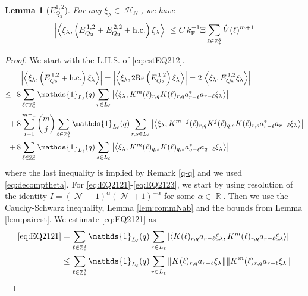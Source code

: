 \documentclass[12pt,a4paper]{article}
\numberwithin{equation}{section}
\newcommand{\1}{\mathbb{I}}
\newcommand{\F}{\mathrm{F}}
\DeclareMathOperator{\R}{\mathbb{R}}
\DeclareMathOperator{\Z}{\mathbb{Z}}
\DeclareMathOperator{\HH}{\mathcal{H}}
\DeclareMathOperator{\NN}{\mathcal{N}}
\newcommand{\eva}[1]{\left\langle #1 \right\rangle}
\theoremstyle{plain}
\newtheorem{lemma}[theorem]{Lemma}
\theoremstyle{definition}
\theoremstyle{remark}
\theoremstyle{plain}
\theoremstyle{definition}
\theoremstyle{remark}
\begin{document}
\begin{lemma}[$E_{Q_2}^{1,2}$]\label{lem:EQ212}
    For any $\xi_\lambda \in \HH_N$, we have
    \begin{alignat}{2}
    \abs{\eva{\xi_\lambda,\left(E^{\,1,2}_{Q_2}+E^{\,2,2}_{Q_2}+\mathrm{h.c.}\right) \xi_\lambda }}
   	\leq   C\, k_{\F}^{-1} \Xi \sum\limits_{\ell \in \Z^3_*} \hat{V}(\ell)^{m+1} \label{eq:estEQ212}
    \end{alignat}
\end{lemma}
\begin{proof}
     We start with the L.H.S. of \eqref{eq:estEQ212}.
    \begin{align}
    	&\abs{\eva{\xi_\lambda,\left(E^{\,1,2}_{Q_2}+\mathrm{h.c.}\right) \xi_\lambda }} = \abs{\eva{\xi_\lambda,2\mathrm{Re}\left(E^{\,1,2}_{Q_2}\right) \xi_\lambda }} = 2\abs{\eva{\xi_\lambda, E^{\,1,2}_{Q_2} \xi_\lambda }}\nonumber\\
    	\leq\,\;8& \sum\limits_{\ell\in \Z^3_*} \mathds{1}_{L_{\ell}}(q) \sum\limits_{r\in L_{\ell}} \abs{\eva{\xi_\lambda, K^m(\ell)_{r,q} K(\ell)_{r,q} a^*_{r-\ell} a_{r-\ell} \xi_\lambda }}\label{eq:EQ2121}\\
    	+\,8& \sum\limits_{j=1}^{m-1} {{m}\choose j} \sum\limits_{\ell \in \Z^3_*}\mathds{1}_{L_{\ell}}(q) \sum\limits_{r,s\in L_{\ell}}  \abs{\eva{\xi_\lambda, K^{m-j}(\ell)_{r,q} K^{j}(\ell)_{q,s} K(\ell)_{r,s} a^*_{r-\ell} a_{r-\ell} \xi_\lambda }} \label{eq:EQ2122}\\
    	+\,8&\sum\limits_{\ell \in \Z^3_*} \mathds{1}_{L_{\ell}}(q) \sum\limits_{ s \in L_{\ell}} \abs{\eva{\xi_\lambda, K^m(\ell)_{q,s} K(\ell)_{q,s} a^*_{q-\ell} a_{q-\ell} \xi_\lambda }}\label{eq:EQ2123}
    \end{align}
    where the last inequality is implied by Remark \ref{q-q} and we used \eqref{eq:decomptheta}.
    For \eqref{eq:EQ2121}-\eqref{eq:EQ2123}, we start by using resolution of the identity $I = (\NN+1)^{\alpha}(\NN+1)^{-\alpha}$ for some $\alpha \in \R$. Then we use the Cauchy-Schwarz inequality, Lemma \ref{lem:commNab} and the bounds from Lemma \ref{lem:pairest}.
    We estimate \eqref{eq:EQ2121} as 
\begin{align}
    \eqref{eq:EQ2121}
    &= \sum\limits_{\ell \in \Z^3_*} \mathds{1}_{L_{\ell}}(q) \sum\limits_{r\in L_{\ell}} \abs{\eva{ K(\ell)_{r,q} a_{r-\ell} \xi_\lambda, K^m(\ell)_{r,q}  a_{r-\ell} \xi_\lambda }}\nonumber\\
    &\leq \sum\limits_{\ell \in \Z^3_*} \mathds{1}_{L_{\ell}}(q) \sum\limits_{r\in L_{\ell}} \norm{ K(\ell)_{r,q} a_{r-\ell} \xi_\lambda}\norm{ K^m(\ell)_{r,q}  a_{r-\ell} \xi_\lambda }\nonumber\\

\end{align}
\end{proof}
\end{document}
